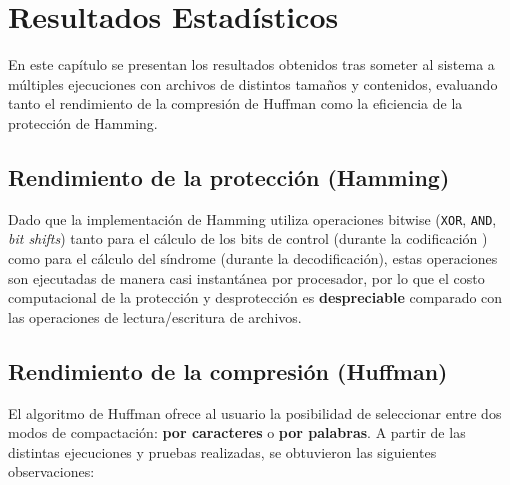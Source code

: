 \chapter*{Resultados Estadísticos}


En este capítulo se presentan los resultados obtenidos tras someter al sistema a múltiples ejecuciones con archivos de distintos tamaños y contenidos, evaluando tanto el rendimiento de la compresión de Huffman como la eficiencia de la protección de Hamming.

\section*{Rendimiento de la protección (Hamming)}


Dado que la implementación de Hamming utiliza operaciones bitwise (\texttt{XOR}, \texttt{AND}, \textit{bit shifts}) tanto para el cálculo de los bits de control (durante la codificación ) como para el cálculo del síndrome (durante la decodificación), estas operaciones son ejecutadas de manera casi instantánea por procesador, por lo que el costo computacional de la protección y desprotección es \textbf{despreciable} comparado con las operaciones de lectura/escritura de archivos.


\section*{Rendimiento de la compresión (Huffman)}


El algoritmo de Huffman ofrece al usuario la posibilidad de seleccionar entre dos modos de compactación: \textbf{por caracteres} o \textbf{por palabras}. A partir de las distintas ejecuciones y pruebas realizadas, se obtuvieron las siguientes observaciones:

